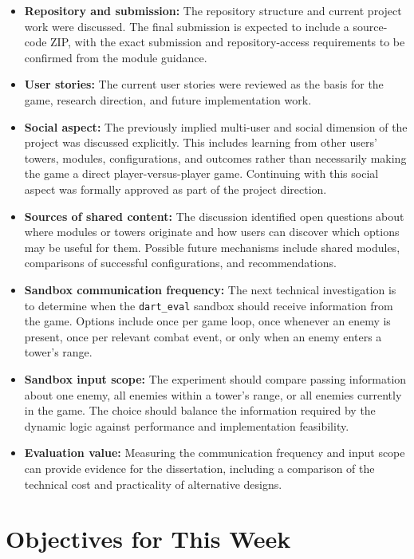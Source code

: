 \documentclass[12pt,a4paper]{article}
\begin{document}
\begin{itemize}[leftmargin=*]
    \item \textbf{Repository and submission:} The repository structure and
    current project work were discussed. The final submission is expected to
    include a source-code ZIP, with the exact submission and repository-access
    requirements to be confirmed from the module guidance.
    \item \textbf{User stories:} The current user stories were reviewed as the
    basis for the game, research direction, and future implementation work.
    \item \textbf{Social aspect:} The previously implied multi-user and social
    dimension of the project was discussed explicitly. This includes learning
    from other users' towers, modules, configurations, and outcomes rather
    than necessarily making the game a direct player-versus-player game.
    Continuing with this social aspect was formally approved as part of the
    project direction.
    \item \textbf{Sources of shared content:} The discussion identified open
    questions about where modules or towers originate and how users can
    discover which options may be useful for them. Possible future mechanisms
    include shared modules, comparisons of successful configurations, and
    recommendations.
    \item \textbf{Sandbox communication frequency:} The next technical
    investigation is to determine when the \texttt{dart\_eval} sandbox should
    receive information from the game. Options include once per game loop,
    once whenever an enemy is present, once per relevant combat event, or only
    when an enemy enters a tower's range.
    \item \textbf{Sandbox input scope:} The experiment should compare passing
    information about one enemy, all enemies within a tower's range, or all
    enemies currently in the game. The choice should balance the information
    required by the dynamic logic against performance and implementation
    feasibility.
    \item \textbf{Evaluation value:} Measuring the communication frequency and
    input scope can provide evidence for the dissertation, including a
    comparison of the technical cost and practicality of alternative designs.
\end{itemize}

\section{Objectives for This Week}
\end{document}
